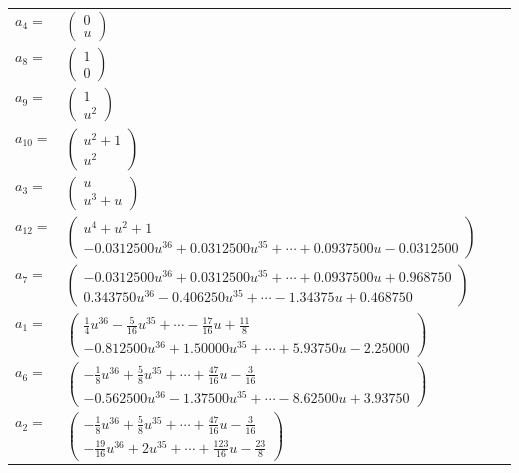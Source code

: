 \documentclass[1p]{elsarticle_modified}
\theoremstyle{definition}
\begin{document}
\begin{tabular}{m{7pt} m{180pt} m{7pt} m{180pt} }
\flushright $a_{4}=$&$\begin{pmatrix}0\\u\end{pmatrix}$ \\
\flushright $a_{8}=$&$\begin{pmatrix}1\\0\end{pmatrix}$ \\
\flushright $a_{9}=$&$\begin{pmatrix}1\\u^2\end{pmatrix}$ \\
\flushright $a_{10}=$&$\begin{pmatrix}u^2+1\\u^2\end{pmatrix}$ \\
\flushright $a_{3}=$&$\begin{pmatrix}u\\u^3+u\end{pmatrix}$ \\
\flushright $a_{12}=$&$\begin{pmatrix}u^4+u^2+1\\-0.0312500 u^{36}+0.0312500 u^{35}+\cdots+0.0937500 u-0.0312500\end{pmatrix}$ \\
\flushright $a_{7}=$&$\begin{pmatrix}-0.0312500 u^{36}+0.0312500 u^{35}+\cdots+0.0937500 u+0.968750\\0.343750 u^{36}-0.406250 u^{35}+\cdots-1.34375 u+0.468750\end{pmatrix}$ \\
\flushright $a_{1}=$&$\begin{pmatrix}\frac{1}{4} u^{36}-\frac{5}{16} u^{35}+\cdots-\frac{17}{16} u+\frac{11}{8}\\-0.812500 u^{36}+1.50000 u^{35}+\cdots+5.93750 u-2.25000\end{pmatrix}$ \\
\flushright $a_{6}=$&$\begin{pmatrix}-\frac{1}{8} u^{36}+\frac{5}{8} u^{35}+\cdots+\frac{47}{16} u-\frac{3}{16}\\-0.562500 u^{36}-1.37500 u^{35}+\cdots-8.62500 u+3.93750\end{pmatrix}$ \\
\flushright $a_{2}=$&$\begin{pmatrix}-\frac{1}{8} u^{36}+\frac{5}{8} u^{35}+\cdots+\frac{47}{16} u-\frac{3}{16}\\-\frac{19}{16} u^{36}+2 u^{35}+\cdots+\frac{123}{16} u-\frac{23}{8}\end{pmatrix}$ \\

\end{tabular}
\end{document}
